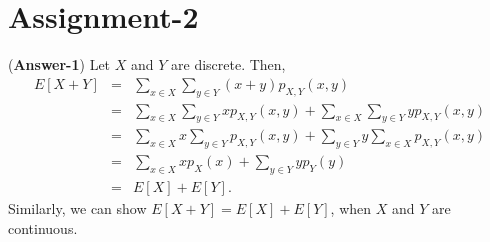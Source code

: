 \documentclass[11pt,twoside,reqno]{article}
\begin{document}
\begin{comment}
(c) Note that $Z = \sqrt{2}X$, therefore, 
\[
P(X>Z) = P((\sqrt{2}-1)X < 0) =   \frac{\sqrt{2}-1}{\sqrt{2\pi}}\int\limits_{-\infty}^{0} e^{-x^2/2}dx =  \frac{\sqrt{2}-1}{\sqrt{2\pi}}\cdot \frac{\sqrt{\pi}}{\sqrt{2}} = \frac{\sqrt{2}-1}{2} \approx 0.207.
\]\\
(d) As in part (c), $P(|X| > |Z|) =  P(|X| > \sqrt{2}|Y|)$. Since we always have either $|X| > \sqrt{2}|Y|$ or $|Y| > \sqrt{2}|X|$ or $\frac{1}{\sqrt{2}}|Y| < |X| < \sqrt{2}|Y|$. Therefore, their probabilities 
sums up to $1$. Also note that $P(|X| > \sqrt{2}|Y|) = P(|Y| > \sqrt{2}|X|)$, therefore, 
\[
P(|X| > |Z|) = P(|X| > \sqrt{2}|Y|) = \frac{1}{2}\left(1 - P(\frac{1}{\sqrt{2}}|Y| < |X| < \sqrt{2}|Y|)\right).
\]
\\
({\bf Answer-5}) Let us set the following for any $i = 1,2,\ldots 6$:
\begin{eqnarray*}
\text{State}-0&:& \text{Outcome $i$ has not occurred even once.} \\
\text{State}-1&:& \text{Outcome $i$ occurred once.} \\
\text{State}-2&:& \text{Outcome $i$ occurred twice.}
\end{eqnarray*}
Let $E_i$ denote the expected number of tosses required to reach from State-$i$ to State-$2$ for $i=0,1$.\\
Then, 
\begin{eqnarray}
E_0 &=& 1 + \frac{1}{6}E_1 + \frac{5}{6}E_0 \\ 
\Rightarrow E_0 &=& 6 + E_1.
\end{eqnarray}
The equation in (1) is obtained as follows: after tossing once, we get $i$ with probability $\frac{1}{6}$ and we move to State-1, or we do not get $i$ with probability $\frac{5}{6}$ 
and we remain in State-0.\\
By similar argument as above, we have 
\[
E_1 = 1 + \frac{1}{6}\cdot 0 + \frac{5}{6}E_0 \quad  \Rightarrow \quad E_1 = 1 + \frac{5}{6}E_0. 
\]
Now, substituting the above value of $E_1$ in equation (2), we get 
\[
E_0 = 6 + 1 + \frac{5}{6}E_0 \quad \Rightarrow \quad E_0 = 42.
\]
\end{comment}


\section{Assignment-2}

({\bf Answer-1}) Let $X$ and $Y$ are discrete. Then,
\begin{eqnarray*}
E[X + Y] &=& \sum\limits_{x \in X}\sum\limits_{y \in Y} (x+y) p_{X,Y}(x,y) \\
&=& \sum\limits_{x \in X}\sum\limits_{y \in Y} xp_{X,Y}(x,y) + \sum\limits_{x \in X}\sum\limits_{y \in Y}yp_{X,Y}(x,y) \\
&=& \sum\limits_{x \in X} x \sum\limits_{y \in Y} p_{X,Y}(x,y) + \sum\limits_{y \in Y} y \sum\limits_{x \in X}p_{X,Y}(x,y) \\
&=& \sum\limits_{x \in X} x  p_{X}(x) + \sum\limits_{y \in Y} y p_{Y}(y) \\
&=& E[X] + E[Y].
\end{eqnarray*}
Similarly, we can show $E[X + Y] = E[X] + E[Y]$, when $X$ and $Y$ are continuous. 
\end{document}
